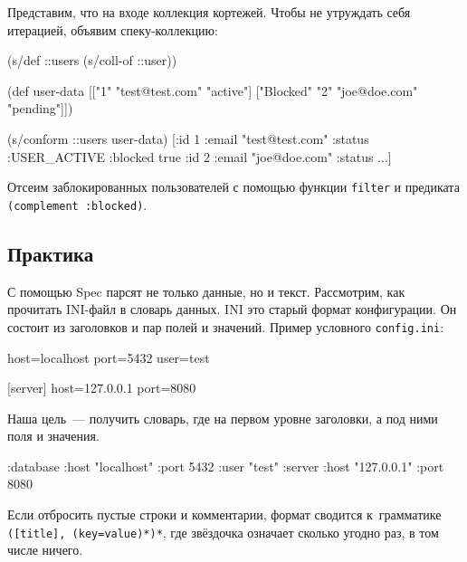 Представим, что на входе коллекция кортежей. Чтобы не утруждать себя итерацией,
объявим спеку-коллекцию:

\begin{english}
  \begin{clojure}
(s/def ::users (s/coll-of ::user))

(def user-data
  [["1" "test@test.com" "active"]
   ["Blocked" "2" "joe@doe.com" "pending"]])

(s/conform ::users user-data)
[{:id 1 :email "test@test.com" :status :USER_ACTIVE}
 {:blocked true :id 2 :email "joe@doe.com" :status ...}]
  \end{clojure}
\end{english}


Отсеим заблокированных пользователей с помощью функции \verb|filter| и
предиката \verb|(complement :blocked)|.

\subsection{Практика}


С помощью Spec парсят не только данные, но и текст. Рассмотрим, как прочитать
INI-файл в словарь данных. INI
это старый формат конфигурации. Он состоит из заголовков и пар полей и
значений. Пример условного \verb|config.ini|:

\begin{english}
  \begin{ini}
[database]
host=localhost
port=5432
user=test

[server]
host=127.0.0.1
port=8080
  \end{ini}
\end{english}

Наша цель~--- получить словарь, где на первом уровне заголовки, а под ними поля
и значения.

\begin{english}
  \begin{clojure}
{:database {:host "localhost"
            :port 5432
            :user "test"}
 :server {:host "127.0.0.1"
          :port 8080}}
  \end{clojure}
\end{english}

Если отбросить пустые строки и комментарии, формат сводится к~грамматике
\verb|([title], (key=value)*)*|, где звёздочка означает сколько угодно раз, в
том числе ничего.


